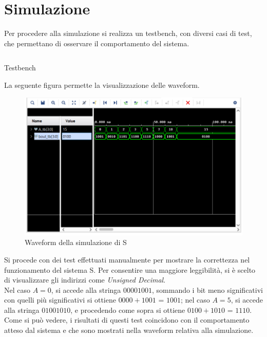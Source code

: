 \section{Simulazione}
Per procedere alla simulazione si realizza un testbench, con diversi casi di test, che permettano di osservare il comportamento del sistema.
\begin{code}
    \inputminted[frame=lines, framesep=2mm, baselinestretch=1.2, bgcolor=LightGray, fontsize=\footnotesize, linenos]{vhdl}{vhdl_files/ROMplusM_tb.vhd}
    \caption{Testbench}
    \label{lst:S_TB}
\end{code}
La seguente figura  permette la visualizzazione delle waveform.
\begin{figure}[H]
	\centering
	\includegraphics[width=1\textwidth]{img/Sim_Rom_plus_M}
	\caption{Waveform della simulazione di S}
	\label{SchemS} 
\end{figure}
Si procede con dei test effettuati manualmente per mostrare la correttezza nel funzionamento del sistema S. Per consentire una maggiore leggibilità, si è scelto di visualizzare gli indirizzi come \textit{Unsigned Decimal}.\\
Nel caso $A = 0$, si accede alla stringa $00001001$, sommando i bit meno significativi con quelli più significativi si ottiene $0000+1001$ = $1001$;
nel caso $A = 5$, si accede alla stringa $01001010$, e procedendo come sopra si ottiene $0100+1010$ = $1110$.\\
Come si può vedere, i risultati di questi test coincidono con il comportamento atteso dal sistema e che sono mostrati nella waveform relativa alla simulazione. 





